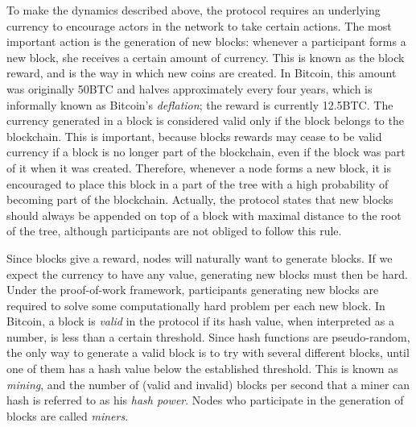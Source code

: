 To make the dynamics described above, the protocol requires an underlying currency to encourage actors in the network to take certain actions. The most important action is 
the generation of new blocks: whenever a participant forms a new block, she receives a certain amount of currency. This is known as the block reward, and is the way in which new coins are created. In Bitcoin, this amount was originally 50BTC and halves approximately every four years, which is informally known as Bitcoin's \emph{deflation}; the reward is currently 12.5BTC. The currency generated in a block is considered valid only if the block belongs to the blockchain. This is important, because blocks rewards may cease to be 
valid currency if a block is no longer part of the blockchain, even if the block was part of it when it was created. 
Therefore, whenever a node forms a new block, it is encouraged to place this block in a part of the tree with a high probability of becoming part of the blockchain. Actually, the protocol states that new blocks should always be appended on top of a block with maximal distance to the root of the tree, although participants are not obliged to follow this rule.

Since blocks give a reward, nodes will naturally want to generate blocks. If we expect the currency to have any value, generating new blocks must then be hard. Under the proof-of-work framework, participants generating new blocks are required to solve some computationally hard problem per each new block. In Bitcoin, a block is \emph{valid} in the protocol if its hash value, when interpreted as a number, is less than a certain threshold. Since hash functions are pseudo-random, the only way to generate a valid block is to try with several different blocks, until one of them has a hash value below the established threshold. This is known as \emph{mining}, and the number of (valid and invalid) blocks per second that a miner can hash is referred to as his \emph{hash power}. Nodes who participate in the generation of blocks %
are called \emph{miners}. 

